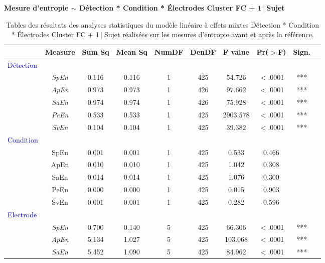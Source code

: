 \begin{table}[!t]
\centering
\scriptsize
\caption[Table des résultats des analyses statistiques pour les mesures d'entropie des électrodes du cluster FC]{Tables des résultats des analyses statistiques du modèle linéaire à effets mixtes Détection * Condition * Électrodes Cluster FC + $1~|~$Sujet réalisées sur les mesures d'entropie avant et après la référence.}
\label{tab:table5statsmesuresentropieelectrode}

\textbf{Mesure d'entropie $\sim$  Détection * Condition * Électrodes Cluster FC + $1~|~$Sujet}

\begin{tabular}{|l|*{9}{c|}}
\hline
& \textbf{Measure} & \textbf{Sum Sq} & \textbf{Mean Sq} & \textbf{NumDF} & \textbf{DenDF} & \textbf{F value} & \textbf{Pr($>$F)} & \textbf{Sign.} \\ 
\hline
\textcolor{blue}{Détection} & & & & & & & & \\ 
\hline
& \textit{SpEn} & 0.116 & 0.116 & 1 & 425 & 54.726 & $<$.0001 & ***\\ 
& \textit{ApEn} & 0.973 & 0.973 & 1 & 426 & 97.662 & $<$.0001 & *** \\ 
& \textit{SaEn} & 0.974 & 0.974 & 1 & 426 & 75.928 & $<$.0001 & *** \\ 
& \textit{PeEn} & 0.533 & 0.533 & 1 & 425 & 2903.578 & $<$.0001 & *** \\ 
& \textit{SvEn} & 0.104 & 0.104 & 1 & 425 & 39.382 & $<$.0001 & *** \\ 
\hline
\textcolor{blue}{Condition} & & & & & & & & \\ 
\hline
& SpEn & 0.001 & 0.001 & 1 & 425 & 0.533 & 0.466 & \\ 
& ApEn & 0.010 & 0.010 & 1 & 425 & 1.042 & 0.308 & \\ 
& SaEn & 0.014 & 0.014 & 1 & 425 & 1.076 & 0.300 & \\ 
& PeEn & 0.000 & 0.000 & 1 & 425 & 0.015 & 0.903 & \\ 
& SvEn & 0.001 & 0.001 & 1 & 425 & 0.282 & 0.596 & \\ 
\hline
\textcolor{blue}{Electrode} & & & & & & & & \\ 
\hline
& \textit{SpEn} & 0.700 & 0.140 & 5 & 425 & 66.306 & $<$.0001 & *** \\ 
& \textit{ApEn} & 5.134 & 1.027 & 5 & 425 & 103.068 & $<$.0001 & *** \\ 
& \textit{SaEn} & 5.452 & 1.090 & 5 & 425 & 84.962 & $<$.0001 & *** \\ 

\end{tabular}
\end{table}
